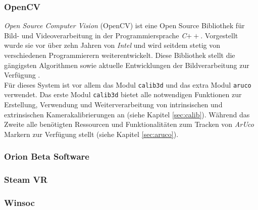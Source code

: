 \subsubsection{OpenCV} \label{sec:OpenCV} 
\textit{Open Source Computer Vision} (OpenCV) ist eine Open Source Bibliothek für Bild- und Videoverarbeitung in der Programmiersprache \textit{C}$++$. Vorgestellt wurde sie vor über zehn Jahren von \textit{Intel} und wird seitdem stetig von verschiedenen Programmierern weiterentwickelt. Diese Bibliothek stellt die gängigsten Algorithmen sowie aktuelle Entwicklungen der Bildverarbeitung zur Verfügung
\cite{article:OpenCV}.\\
Für dieses System ist vor allem das Modul \texttt{calib3d} \cite{website:Calib3dDoc} und das extra Modul \texttt{aruco} \cite{website:ArucoDoc} verwendet. Das erste Modul \texttt{calib3d}  bietet alle notwendigen Funktionen zur Erstellung, Verwendung und Weiterverarbeitung von intrinsischen und extrinsischen Kamerakalibrierungen an (siehe Kapitel \ref{sec:calib}). Während das Zweite alle benötigten Ressourcen und Funktionalitäten zum Tracken von \textit{ArUco} Markern zur Verfügung stellt (siehe Kapitel \ref{sec:aruco}).





\subsubsection{Orion Beta Software} \label{OBS}

\subsubsection{Steam VR}
\subsubsection{Winsoc}

\newpage